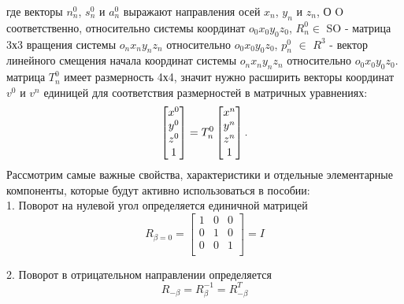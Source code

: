 \hspace*{\parindent} где векторы  $n_n^0$,  $s_n^0$ и $a_n^0$ выражают направления осей $x_n$, $y_n$ и $z_n$, О O соответственно, относительно системы координат $o_0 x_0 y_0 z_0$, $R_n^0 \in$ SO - матрица 3х3 вращения системы  $o_n x_n y_n z_n$ относительно $o_0 x_0 y_0 z_0$, $p_n^0$ $\in$ $R^3$ - вектор линейного смещения начала координат системы  $o_n x_n y_n z_n$ относительно $o_0 x_0 y_0 z_0$.\\
\hspace*{\parindent} матрица $T_n^0$ имеет размерность 4х4, значит нужно расширить векторы координат $v^0$ и $v^n$ единицей для соответствия размерностей в матричных уравнениях:\\
\begin{equation*}\label{eq:model}
     \begin{bmatrix}
     x^0 \\
     y^0\\
     z^0\\
     1\\
    \end{bmatrix}
     =T_n^0
     \begin{bmatrix}
     x^n \\
     y^n\\
     z^n\\
     1\\
    \end{bmatrix}
    .\\
\end{equation*} 
\hspace*{\parindent} Рассмотрим самые важные свойства, характеристики и отдельные элементарные компоненты, которые будут активно использоваться в пособии:\\

1. Поворот на нулевой угол определяется единичной матрицей\\
\begin{equation*}\label{eq:model}
R_{\beta=0} = 
     \begin{bmatrix}
    1 & 0 & 0\\
    0 & 1 & 0\\
    0 & 0 & 1\\
    \end{bmatrix}
     =I
\end{equation*} 

2. Поворот в отрицательном направлении определяется
\begin{equation*}\label{eq:model}
R_{-\beta} = R_{\beta}^{-1} = R_{-\beta}^T
\end{equation*} 


